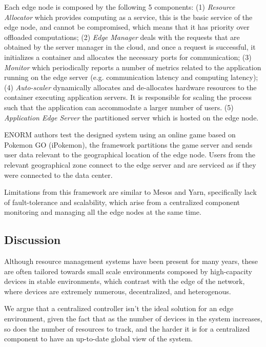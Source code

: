 Each edge node is composed by the following 5 components: (1) \textit{Resource Allocator} which provides computing as a service, this is the basic service of the edge node, and cannot be compromised, which means that it has priority over offloaded computations; (2) \textit{Edge Manager} deals with the requests that are obtained by the server manager in the cloud, and once a request is successful, it initializes a container and allocates the necessary ports for communication; (3) \textit{Monitor} which periodically reports a number of metrics related to the application running on the edge server (e.g. communication latency and computing latency); (4) \textit{Auto-scaler} dynamically allocates and de-allocates hardware resources to the container executing application servers. It is responsible for scaling the process such that the application can accommodate a larger number of users. (5) \textit{Application Edge Server} the partitioned server which is hosted on the edge node.

ENORM authors test the designed system using an online game based on Pokemon GO (iPokemon)\cite{pokemonGo}, the framework partitions the game server and sends  user data relevant to the geographical location of the edge node. Users from the relevant geographical zone connect to the edge server and are serviced as if they were connected to the data center. 

Limitations from this framework are similar to Mesos and Yarn, specifically lack of fault-tolerance and scalability, which arise from a centralized component monitoring and managing all the edge nodes at the same time. 

\subsection{Discussion}

Although resource management systems have been present for many years, these are often tailored towards small scale environments composed by high-capacity devices in stable environments, which contrast with the edge of the network, where devices are extremely numerous, decentralized, and heterogenous.

We argue that a centralized controller isn't the ideal solution for an edge environment, given the fact that as the number of devices in the system increases, so does the number of resources to track, and the harder it is for a centralized component to have an up-to-date global view of the system. 


